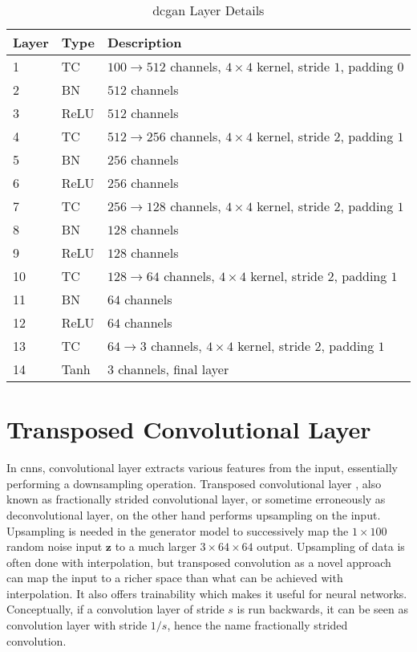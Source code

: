 \begin{table}[h]
  \centering
  \caption{\gls{dcgan} Layer Details}
  \begin{tabular}{l | l | l }
    \toprule
    Layer & Type & Description \\
    \midrule
    1 & TC & $100 \rightarrow 512$ channels, $4 \times 4$ kernel, stride $1$, padding $0$ \\
    2 & BN & $512$ channels\\
    3 & ReLU & $512$ channels \\
    4 & TC & $512 \rightarrow 256$ channels, $4 \times 4$ kernel, stride $2$, padding $1$ \\
    5 & BN & $256$ channels \\
    6 & ReLU & $256$ channels \\
    7 & TC & $256 \rightarrow 128$ channels, $4 \times 4$ kernel, stride $2$, padding $1$ \\
    8 & BN & $128$ channels \\
    9 & ReLU & $128$ channels \\
    10 & TC & $128 \rightarrow 64$ channels, $4 \times 4$ kernel, stride $2$, padding $1$ \\
    11 & BN & $64$ channels \\
    12 & ReLU & $64$ channels \\
    13 & TC & $64 \rightarrow 3$ channels, $4 \times 4$ kernel, stride $2$, padding $1$ \\
    14 & Tanh & 3 channels, final layer \\
    \bottomrule
  \end{tabular}
  \label{table:network_layers}
\end{table}

\section{Transposed Convolutional Layer}

In \gls{cnn}s, convolutional layer extracts various features from the input, essentially performing a
downsampling operation. Transposed convolutional layer \cite{transposed_convolution}, also known as
fractionally strided convolutional layer, or sometime erroneously as deconvolutional layer, on the other
hand performs upsampling on the input.  Upsampling is needed in the generator model to successively map the
$1 \times 100$ random noise input $\boldsymbol{z}$ to a much larger $3 \times 64 \times 64$ output. Upsampling of data is often
done with interpolation, but transposed convolution as a novel approach can map the input to a richer space
than what can be achieved with interpolation. It also offers trainability which makes it useful for neural
networks. Conceptually, if a convolution layer of stride $s$ is run backwards, it can be seen as convolution
layer with stride $1/s$, hence the name fractionally strided convolution.

